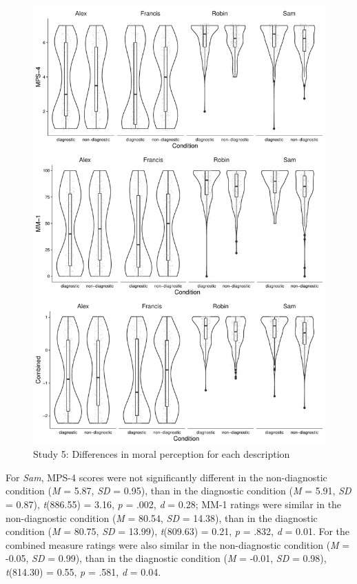 \documentclass[
  american,
  man,mask,floatsintext]{apa6}
\begin{document}
\begin{figure}[!p]
\includegraphics{Supplementary_files/figure-latex/S5allscenariosPlot-1} \caption{Study 5: Differences in moral perception for each description}\label{fig:S5allscenariosPlot}
\end{figure}

For \emph{Sam}, MPS-4 scores were not significantly different in the non-diagnostic condition (\emph{M} = 5.87, \emph{SD} = 0.95), than in the diagnostic condition (\emph{M} = 5.91, \emph{SD} = 0.87), \emph{t}(886.55) = 3.16, \emph{p} = .002, \emph{d} = 0.28; MM-1 ratings were similar in the non-diagnostic condition (\emph{M} = 80.54, \emph{SD} = 14.38), than in the diagnostic condition (\emph{M} = 80.75, \emph{SD} = 13.99), \emph{t}(809.63) = 0.21, \emph{p} = .832, \emph{d} = 0.01. For the combined measure ratings were also similar in the non-diagnostic condition (\emph{M} = -0.05, \emph{SD} = 0.99), than in the diagnostic condition (\emph{M} = -0.01, \emph{SD} = 0.98), \emph{t}(814.30) = 0.55, \emph{p} = .581, \emph{d} = 0.04.
\end{document}
